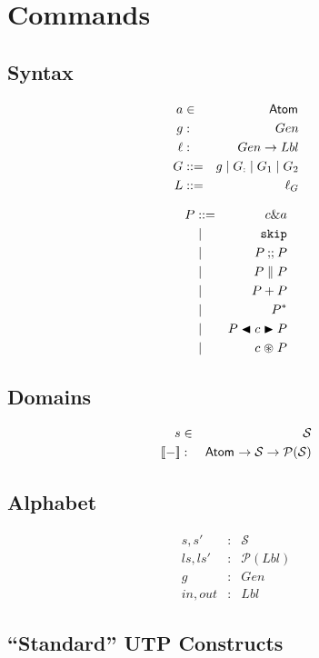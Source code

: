 \section{Commands}\label{sec:commands}



\subsection{Syntax}

\begin{eqnarray*}
   a &\in& \mathsf{Atom_{}}
\\ g &:& Gen
\\ \ell &:& Gen \rightarrow Lbl
\\ G &::=&  g \mid G_{:} \mid G_1 \mid G_2
\\ L &::=& \ell_G
\end{eqnarray*}

\begin{eqnarray*}
   P &::= & c \& a
\\   &\mid& \texttt{skip}
\\   &\mid& P \mathbin{;\!;} P
\\   &\mid& P \parallel P
\\   &\mid& P+P
\\   &\mid& P^*
\\   &\mid& P \mathrel{\blacktriangleleft{c}\blacktriangleright} P
\\   &\mid& c \mathrel{\circledast} P
\end{eqnarray*}

\subsection{Domains}
\begin{eqnarray*}
   s &\in& \mathcal S
\\ \sem{-} &:& \Atom{} \fun \mathcal S \fun \mathcal P(\mathcal S)
\end{eqnarray*}

\subsection{Alphabet}

\begin{eqnarray*}
   s, s' &:& \mathcal S
\\ ls, ls' &:& \mathcal P (Lbl)
\\ g &:& Gen
\\ in, out &:& Lbl
\end{eqnarray*}

\subsection{``Standard'' UTP Constructs}

